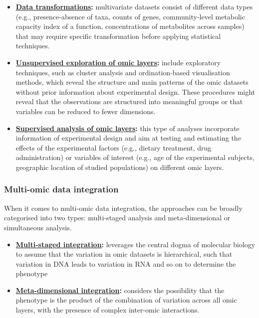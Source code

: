 \documentclass[
]{book}
\providecommand{\tightlist}{%
  \setlength{\itemsep}{0pt}\setlength{\parskip}{0pt}}
\begin{document}
\begin{itemize}
\tightlist
\item
  \textbf{\protect\hyperlink{data-transformations}{Data transformations}:} multivariate datasets consist of different data types (e.g., presence-absence of taxa, counts of genes, community-level metabolic capacity index of a function, concentrations of metabolites across samples) that may require specific transformation before applying statistical techniques.
\item
  \textbf{\protect\hyperlink{unsupervised-exploration}{Unsupervised exploration of omic layers}:} include exploratory techniques, such as cluster analysis and ordination-based visualisation methods, which reveal the structure and main patterns of the omic datasets without prior information about experimental design. These procedures might reveal that the observations are structured into meaningful groups or that variables can be reduced to fewer dimensions.
\item
  \textbf{\protect\hyperlink{supervised-analysis}{Supervised analysis of omic layers}:} this type of analyses incorporate information of experimental design and aim at testing and estimating the effects of the experimental factors (e.g., dietary treatment, drug administration) or variables of interest (e.g., age of the experimental subjects, geographic location of studied populations) on different omic layers.
\end{itemize}

\hypertarget{multi-omic-data-integration}{%
\subsubsection*{Multi-omic data integration}\label{multi-omic-data-integration}}

When it comes to multi-omic data integration, the approaches can be broadly categorised into two types: multi-staged analysis and meta-dimensional or simultaneous analysis.

\begin{itemize}
\item
  \textbf{\protect\hyperlink{multi-staged-integration}{Multi-staged integration}:} leverages the central dogma of molecular biology to assume that the variation in omic datasets is hierarchical, such that variation in DNA leads to variation in RNA and so on to determine the phenotype
\item
  \textbf{\protect\hyperlink{meta-dimensional-integration}{Meta-dimensional integration}:} considers the possibility that the phenotype is the product of the combination of variation across all omic layers, with the presence of complex inter-omic interactions.
\end{itemize}
\end{document}
